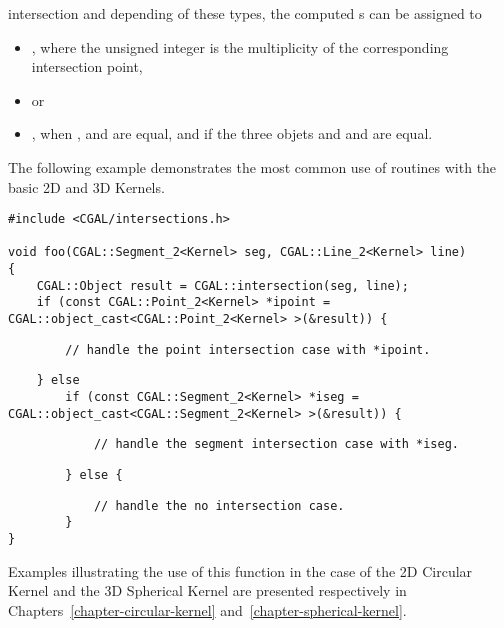 \begin{ccRefFunction}{intersection}
and depending of these types, the computed s can be 
assigned to 
\begin{itemize}
\item {} ,
where the unsigned integer is the multiplicity of the corresponding
intersection point,
\item {}  or
\item {} , when ,  and 
 are equal, and if the three objets  and  
and  are equal.
\end{itemize} 

\ccExample

The following example demonstrates the most common use of 
 routines with the basic 2D and 3D Kernels.
\begin{verbatim}
#include <CGAL/intersections.h>

void foo(CGAL::Segment_2<Kernel> seg, CGAL::Line_2<Kernel> line)
{
    CGAL::Object result = CGAL::intersection(seg, line);
    if (const CGAL::Point_2<Kernel> *ipoint = CGAL::object_cast<CGAL::Point_2<Kernel> >(&result)) {
\end{verbatim}%
\ccHtmlLinksOff%
\begin{verbatim}
        // handle the point intersection case with *ipoint.
\end{verbatim}%
\ccHtmlLinksOn%
\begin{verbatim}
    } else
        if (const CGAL::Segment_2<Kernel> *iseg = CGAL::object_cast<CGAL::Segment_2<Kernel> >(&result)) {
\end{verbatim}%
\ccHtmlLinksOff%
\begin{verbatim}
            // handle the segment intersection case with *iseg.
\end{verbatim}%
\ccHtmlLinksOn%
\begin{verbatim}
        } else {
\end{verbatim}%
\ccHtmlLinksOff%
\begin{verbatim}
            // handle the no intersection case.
        }
}
\end{verbatim}%
\ccHtmlLinksOn%

Examples illustrating the use of this function in the case of the 2D
Circular Kernel and the 3D Spherical Kernel are presented respectively
in Chapters~\ref{chapter-circular-kernel}
and~\ref{chapter-spherical-kernel}.

\ccSeeAlso
 \\ 
 \\

\end{ccRefFunction}
